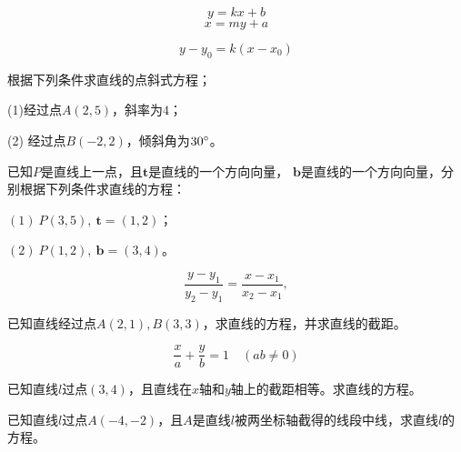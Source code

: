 \begin{definition}[直线的斜截式方程]
    \begin{equation}
        y=kx+b
    \end{equation}
    \begin{equation}
        x=my+a
    \end{equation}
\end{definition}


\begin{definition}[直线的点斜式方程]
    \begin{equation}
        y-y_0=k(x-x_0)
    \end{equation}
\end{definition}
\begin{example}
    根据下列条件求直线的点斜式方程；
    
    (1)经过点$A(2,5)$，斜率为$4$；

(2) 经过点$B(-2,2)$，倾斜角为\(30^\circ \)。
\end{example}

\begin{example}
    已知$P$是直线上一点，且\(\mathbf{t}\)是直线的一个方向向量，
    \(\mathbf{b}\)是直线的一个方向向量，分别根据下列条件求直线的方程：

$(1)\ P(3,5),\ \mathbf{t}=(1,2)$；      

$(2)\ P(1,2),\ \mathbf{b}=(3,4)$。
\end{example}




\begin{definition}[直线的两点式方程]
    
    \begin{equation}
        \frac{y-y_{1}}{y_{2}-y_{1}}=\frac{x-x_{1}}{x_{2}-x_{1}},
    \end{equation}
\end{definition}

\begin{example}
    已知直线经过点$A(2,1),B(3,3)$，求直线的方程，并求直线的截距。
\end{example}
\begin{definition}[直线的截距式方程]
    \begin{equation}
        \frac{x}{a}+\frac{y}{b}=1\quad (ab\neq 0)
    \end{equation}
\end{definition}

\begin{example}
    已知直线\(l\)过点\((3,4)\)，且直线在\(x\)轴和\(y\)轴上的截距相等。求直线的方程。
\end{example}
\begin{exercise}
    已知直线\(l\)过点\(A(-4,-2)\)，且\(A\)是直线\(l\)被两坐标轴截得的线段中线，求直线\(l\)的方程。
\end{exercise}

